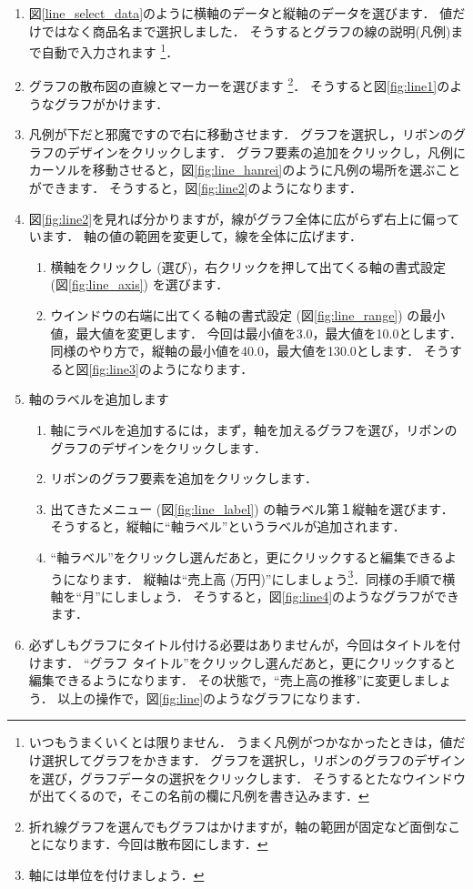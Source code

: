 \begin{enumerate}
    \item 図\ref{line_select_data}のように横軸のデータと縦軸のデータを選びます．
    値だけではなく商品名まで選択しました．
    そうするとグラフの線の説明(凡例)まで自動で入力されます
    \footnote{いつもうまくいくとは限りません．
      うまく凡例がつかなかったときは，値だけ選択してグラフをかきます．
      グラフを選択し，リボンのグラフのデザインを選び，グラフデータの選択をクリックします．
      そうするとたなウインドウが出てくるので，そこの名前の欄に凡例を書き込みます．}．
    \item グラフの散布図の直線とマーカーを選びます
    \footnote{折れ線グラフを選んでもグラフはかけますが，軸の範囲が固定など面倒なことになります．今回は散布図にします．}．
    そうすると図\ref{fig:line1}のようなグラフがかけます．
    \item 凡例が下だと邪魔ですので右に移動させます．
    グラフを選択し，リボンのグラフのデザインをクリックします．
    グラフ要素の追加をクリックし，凡例にカーソルを移動させると，図\ref{fig:line_hanrei}のように凡例の場所を選ぶことができます．
    そうすると，図\ref{fig:line2}のようになります．
    \item 図\ref{fig:line2}を見れば分かりますが，線がグラフ全体に広がらず右上に偏っています．
    軸の値の範囲を変更して，線を全体に広げます．
    \begin{enumerate}
        \item 横軸をクリックし (選び)，右クリックを押して出てくる軸の書式設定 (図\ref{fig:line_axis}) を選びます．
        \item ウインドウの右端に出てくる軸の書式設定 (図\ref{fig:line_range}) の最小値，最大値を変更します．
        今回は最小値を3.0，最大値を10.0とします．
        同様のやり方で，縦軸の最小値を40.0，最大値を130.0とします．
        そうすると図\ref{fig:line3}のようになります．
    \end{enumerate}
    \item 軸のラベルを追加します
    \begin{enumerate}
        \item 軸にラベルを追加するには，まず，軸を加えるグラフを選び，リボンのグラフのデザインをクリックします．
        \item リボンのグラフ要素を追加をクリックします．
        \item 出てきたメニュー (図\ref{fig:line_label}) の軸ラベル第１縦軸を選びます．
        そうすると，縦軸に``軸ラベル''というラベルが追加されます．
        \item ``軸ラベル''をクリックし選んだあと，更にクリックすると編集できるようになります．
        縦軸は``売上高 (万円)''にしましょう\footnote{軸には単位を付けましょう．}．同様の手順で横軸を``月''にしましょう．
        そうすると，図\ref{fig:line4}のようなグラフができます．
    \end{enumerate}
    \item 必ずしもグラフにタイトル付ける必要はありませんが，今回はタイトルを付けます．
    ``グラフ タイトル''をクリックし選んだあと，更にクリックすると編集できるようになります．
    その状態で，``売上高の推移''に変更しましょう．
    以上の操作で，図\ref{fig:line}のようなグラフになります．
\end{enumerate}

